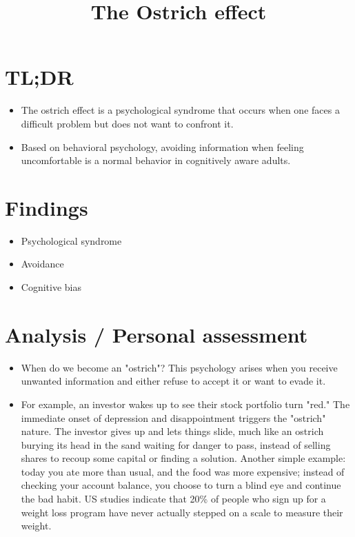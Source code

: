 \documentclass{../researchlog}
\title{The Ostrich effect}
\author{}
\date{}
\begin{document}
\maketitle
\vspace{-2.5em}


\section{TL;DR}

\begin{itemize}[leftmargin=*]
    \item The ostrich effect is a psychological syndrome that occurs when one faces a difficult problem but does not want to confront it.
    \item Based on behavioral psychology, avoiding information when feeling uncomfortable is a normal behavior in cognitively aware adults.
\end{itemize}

\section{Findings}

\begin{itemize}[leftmargin=*]
    \item Psychological syndrome
    \item Avoidance
    \item Cognitive bias
\end{itemize}

\section{Analysis / Personal assessment}

\begin{itemize}[leftmargin=*]
    \item When do we become an "ostrich"? This psychology arises when you receive unwanted information and either refuse to accept it or want to evade it.
    \item For example, an investor wakes up to see their stock portfolio turn "red." The immediate onset of depression and disappointment triggers the "ostrich" nature. The investor gives up and lets things slide, much like an ostrich burying its head in the sand waiting for danger to pass, instead of selling shares to recoup some capital or finding a solution. Another simple example: today you ate more than usual, and the food was more expensive; instead of checking your account balance, you choose to turn a blind eye and continue the bad habit. US studies indicate that 20\% of people who sign up for a weight loss program have never actually stepped on a scale to measure their weight.
\end{itemize}
\end{document}
